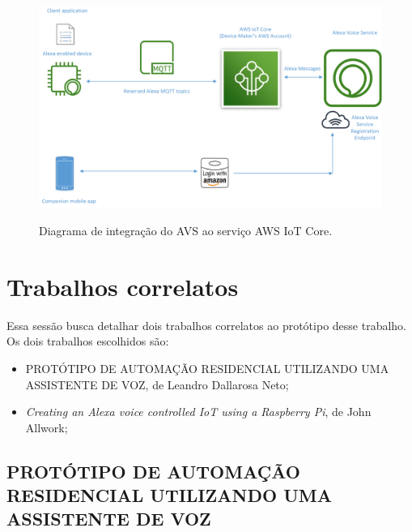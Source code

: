 \begin{figure}[htbp]
    \centering
    \caption{Diagrama de integração do AVS ao serviço AWS IoT Core.}
    \includegraphics[scale=0.6]{Imagens/integracao_avs_aws_iot.png}
    \label{fig:integracao_avs_aws_iot}
\end{figure}

\section{Trabalhos correlatos}

Essa sessão busca detalhar dois trabalhos correlatos ao protótipo desse trabalho. Os dois trabalhos escolhidos são:

\begin{itemize}
    \item PROTÓTIPO DE AUTOMAÇÃO RESIDENCIAL UTILIZANDO UMA ASSISTENTE DE VOZ, de Leandro Dallarosa Neto;
    \item \textit{Creating an Alexa voice controlled IoT using a Raspberry Pi}, de John Allwork;
\end{itemize}

\subsection{PROTÓTIPO DE AUTOMAÇÃO RESIDENCIAL UTILIZANDO UMA ASSISTENTE DE VOZ}\label{subsection:prototipo_de_automacao_residencial_utilizando_uma_assistente_de_voz}

